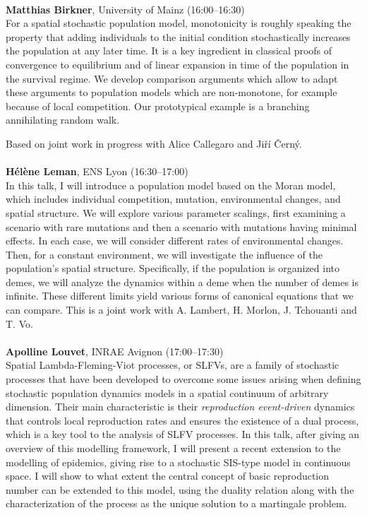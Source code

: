 \documentclass[12pt,a4paper]{article}
\begin{document}
\\[1ex]{ \large \textbf{ Matthias Birkner}}, University of Mainz (16:00--16:30) \\[2ex] For a spatial stochastic population model, monotonicity is roughly speaking the property that adding individuals to the initial condition stochastically increases the population at any later time. It is a key ingredient in classical proofs of convergence to equilibrium and of linear expansion in time of the population in the survival regime. We develop comparison arguments which allow to adapt these arguments to population models which are non-monotone, for example because of local competition. Our prototypical example is a branching annihilating random walk. 

 Based on joint work in progress with Alice Callegaro and Ji\v{r}\'{i} \v{C}ern\'y. \\
\\[1ex]{ \large \textbf{ Hélène Leman}}, ENS Lyon (16:30--17:00) \\[2ex] In this talk, I will introduce a population model based on the Moran model, which includes individual competition, mutation, environmental changes, and spatial structure. We will explore various parameter scalings, first examining a scenario with rare mutations and then a scenario with mutations having minimal effects. In each case, we will consider different rates of environmental changes. Then, for a constant environment, we will investigate the influence of the population's spatial structure. Specifically, if the population is organized into demes, we will analyze the dynamics within a deme when the number of demes is infinite. These different limits yield various forms of canonical equations that we can compare. This is a joint work with A. Lambert, H. Morlon, J. Tchouanti and T. Vo. \\
\\[1ex]{ \large \textbf{ Apolline Louvet}}, INRAE Avignon (17:00--17:30) \\[2ex] Spatial Lambda-Fleming-Viot processes, or SLFVs, are a family of stochastic processes that have been developed to overcome some issues arising when defining stochastic population dynamics models in a spatial continuum of arbitrary dimension. Their main characteristic is their {\em reproduction event-driven} dynamics that controls local reproduction rates and ensures the existence of a dual process, which is a key tool to the analysis of SLFV processes. In this talk, after giving an overview of this modelling framework, I will present a recent extension to the modelling of epidemics, giving rise to a stochastic SIS-type model in continuous space. I will show to what extent the central concept of basic reproduction number can be extended to this model, using the duality relation along with the characterization of the process as the unique solution to a martingale problem. 
 
\end{document}
